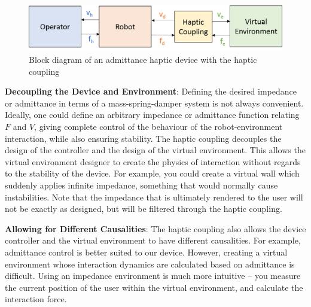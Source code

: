 \documentclass[12pt]{report}
\begin{document}
			\begin{figure}[h] 
		\centering
		\includegraphics[width=\linewidth]{haptic_admittance_coupling}
		\caption{Block diagram of an admittance haptic device with the haptic coupling}
		\label{fig:haptic_adm_coup}
	\end{figure}	

	
	\textbf{Decoupling the Device and Environment}: Defining the desired impedance or admittance in terms of a mass-spring-damper system is not always convenient. Ideally, one could define an arbitrary impedance or admittance function relating $F$ and $V$, giving complete control of the behaviour of the robot-environment interaction, while also ensuring stability. The haptic coupling decouples the design of the controller and the design of the virtual environment. This allows the virtual environment designer to create the physics of interaction without regards to the stability of the device. For example, you could create a virtual wall which suddenly applies infinite impedance, something that would normally cause instabilities. Note that the impedance that is ultimately rendered to the user will not be exactly as designed, but will be filtered through the haptic coupling.
	

	
	\textbf{Allowing for Different Causalities}: The haptic coupling also allows the device controller and the virtual environment to have different causalities. For example, admittance control is better suited to our device. However, creating a virtual environment whose interaction dynamics are calculated based on admittance is difficult. Using an impedance environment is much more intuitive -- you measure the current position of the user within the virtual environment, and calculate the interaction force. \\
		
	
\end{document}

